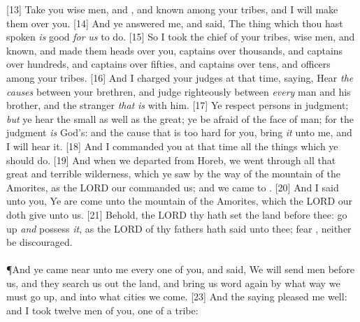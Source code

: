 [13] \textcolor[cmyk]{0.99998,1,0,0}{Take you wise men, and , and known among your tribes, and I will make them  over you.}
[14] \textcolor[cmyk]{0.99998,1,0,0}{And ye answered me, and said, The thing which thou hast spoken \emph{is} good \emph{for} \emph{us} to do.}
[15] \textcolor[cmyk]{0.99998,1,0,0}{So I took the chief of your tribes, wise men, and known, and made them heads over you, captains over thousands, and captains over hundreds, and captains over fifties, and captains over tens, and officers among your tribes.}
[16] \textcolor[cmyk]{0.99998,1,0,0}{And I charged your judges at that time, saying, Hear \emph{the} \emph{causes} between your brethren, and judge righteously between \emph{every} man and his brother, and the stranger \emph{that} \emph{is} with him.}
[17] \textcolor[cmyk]{0.99998,1,0,0}{Ye   respect persons in judgment; \emph{but} ye  hear the small as well as the great; ye   be afraid of the face of man; for the judgment \emph{is} God's: and the cause that is too hard for you, bring \emph{it} unto me, and I will hear it.}
[18] \textcolor[cmyk]{0.99998,1,0,0}{And I commanded you at that time all the things which ye should do.}
[19] \textcolor[cmyk]{0.99998,1,0,0}{And when we departed from Horeb, we went through all that great and terrible wilderness, which ye saw by the way of the mountain of the Amorites, as the LORD our  commanded us; and we came to .}
[20] \textcolor[cmyk]{0.99998,1,0,0}{And I said unto you, Ye are come unto the mountain of the Amorites, which the LORD our  doth give unto us.}
[21] \textcolor[cmyk]{0.99998,1,0,0}{Behold, the LORD thy  hath set the land before thee: go up \emph{and} possess \emph{it}, as the LORD  of thy fathers hath said unto thee; fear , neither be discouraged.}\\
\\
\P \textcolor[cmyk]{0.99998,1,0,0}{And ye came near unto me every one of you, and said, We will send men before us, and they  search us out the land, and bring us word again by what way we must go up, and into what cities we  come.}
[23] \textcolor[cmyk]{0.99998,1,0,0}{And the saying pleased me well: and I took twelve men of you, one of a tribe:}
